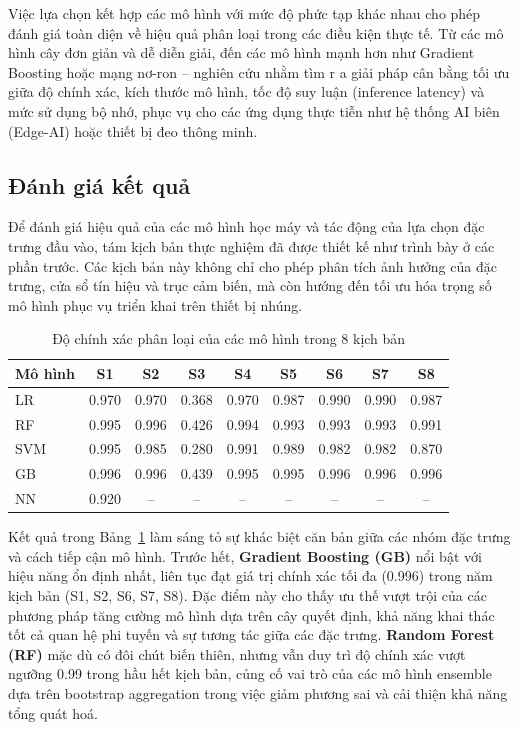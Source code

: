 Việc lựa chọn kết hợp các mô hình với mức độ phức tạp khác nhau cho phép đánh giá toàn diện về 
hiệu quả phân loại trong các điều kiện thực tế. 
Từ các mô hình cây đơn giản và dễ diễn giải, đến các mô hình mạnh 
hơn như Gradient Boosting hoặc mạng nơ-ron – nghiên cứu nhằm tìm r
a giải pháp cân bằng tối ưu giữa độ chính xác, kích thước mô hình, 
tốc độ suy luận (inference latency) và mức sử dụng bộ nhớ, 
phục vụ cho các ứng dụng thực tiễn như hệ thống AI biên (Edge-AI) 
hoặc thiết bị đeo thông minh.
\subsection{Đánh giá kết quả}
Để đánh giá hiệu quả của các mô hình học máy và tác động của lựa 
chọn đặc trưng đầu vào, tám kịch bản thực nghiệm đã được thiết kế 
như trình bày ở các phần trước. Các kịch bản này không chỉ cho phép 
phân tích ảnh hưởng của đặc trưng, cửa sổ tín hiệu và trục cảm biến, 
mà còn hướng đến tối ưu hóa trọng số mô hình phục vụ triển khai trên 
thiết bị nhúng.


\begin{table}[htbp]
\caption{Độ chính xác phân loại của các mô hình trong 8 kịch bản}
\label{tab:accuracy}
\centering
\renewcommand{\arraystretch}{1.1}
\scriptsize
\begin{tabular}{|l|c|c|c|c|c|c|c|c|}
\hline
\textbf{Mô hình} & S1 & S2 & S3 & S4 & S5 & S6 & S7 & S8 \\
\hline
LR  & 0.970 & 0.970 & 0.368 & 0.970 & 0.987 & 0.990 & 0.990 & 0.987 \\
RF  & 0.995 & 0.996 & 0.426 & 0.994 & 0.993 & 0.993 & 0.993 & 0.991 \\
SVM & 0.995 & 0.985 & 0.280 & 0.991 & 0.989 & 0.982 & 0.982 & 0.870 \\
GB  & 0.996 & 0.996 & 0.439 & 0.995 & 0.995 & 0.996 & 0.996 & 0.996 \\
NN  &  0.920 &  --   &  --   &  --   &  --   &  --   &  --   & -- \\
\hline
\end{tabular}
\end{table}

Kết quả trong Bảng~\ref{tab:accuracy} làm sáng tỏ sự khác biệt căn bản giữa các nhóm đặc trưng và cách tiếp cận mô hình. 
Trước hết, \textbf{Gradient Boosting (GB)} nổi bật với hiệu năng ổn định nhất, 
liên tục đạt giá trị chính xác tối đa (0.996) trong năm kịch bản (S1, S2, S6, S7, S8). 
Đặc điểm này cho thấy ưu thế vượt trội của các phương pháp tăng cường mô hình dựa trên cây quyết định, 
khả năng khai thác tốt cả quan hệ phi tuyến và sự tương tác giữa các đặc trưng. 
\textbf{Random Forest (RF)} mặc dù có đôi chút biến thiên, nhưng vẫn duy trì độ chính xác vượt ngưỡng 0.99 trong hầu hết kịch bản, 
củng cố vai trò của các mô hình ensemble dựa trên bootstrap aggregation trong việc giảm phương sai và cải thiện khả năng tổng quát hoá.  

